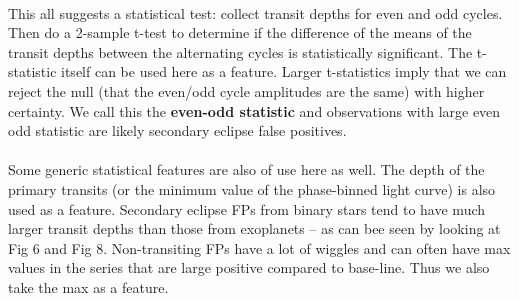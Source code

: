 \documentclass{article}
\begin{document}
\paragraph{} This all suggests a statistical test: collect transit depths for even and odd cycles. Then do a 2-sample t-test to determine if the difference of the means of the transit depths between the alternating cycles is statistically significant. The t-statistic itself can be used here as a feature. Larger t-statistics imply that we can reject the null (that the even/odd cycle amplitudes are the same) with higher certainty. We call this the \textbf{even-odd statistic} and observations with large even odd statistic are likely secondary eclipse false positives.
\paragraph{} Some generic statistical features are also of use here as well. The depth of the primary transits (or the minimum value of the phase-binned light curve) is also used as a feature. Secondary eclipse FPs from binary stars tend to have much larger transit depths than those from exoplanets -- as can bee seen by looking at Fig 6 and Fig 8. Non-transiting FPs have a lot of wiggles and can often have max values in the series that are large positive compared to base-line. Thus we also take the max as a feature.
\end{document}
